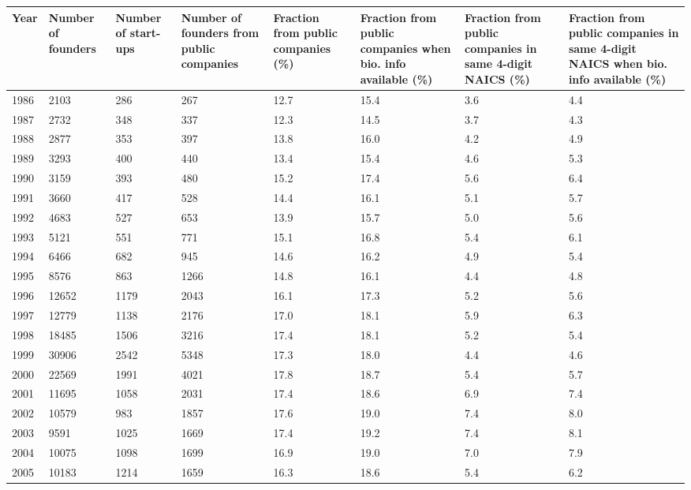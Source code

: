\begin{table}[!htb]
\centering
\begingroup\scriptsize
\begin{tabular}{p{1.75cm}p{1.75cm}p{1.75cm}p{1.75cm}p{1.75cm}p{1.75cm}p{1.75cm}p{1.75cm}}
  \toprule
Year & Number of founders & Number of start-ups & Number of founders from public companies & Fraction from public companies (\%) & Fraction from public companies when bio. info available (\%) & Fraction from public companies in same 4-digit NAICS (\%) & Fraction from public companies in same 4-digit NAICS when bio. info available (\%) \\ 
  \midrule
1986 & 2103 & 286 & 267 & 12.7 & 15.4 & 3.6 & 4.4 \\ 
  1987 & 2732 & 348 & 337 & 12.3 & 14.5 & 3.7 & 4.3 \\ 
  1988 & 2877 & 353 & 397 & 13.8 & 16.0 & 4.2 & 4.9 \\ 
  1989 & 3293 & 400 & 440 & 13.4 & 15.4 & 4.6 & 5.3 \\ 
  1990 & 3159 & 393 & 480 & 15.2 & 17.4 & 5.6 & 6.4 \\ 
  1991 & 3660 & 417 & 528 & 14.4 & 16.1 & 5.1 & 5.7 \\ 
  1992 & 4683 & 527 & 653 & 13.9 & 15.7 & 5.0 & 5.6 \\ 
  1993 & 5121 & 551 & 771 & 15.1 & 16.8 & 5.4 & 6.1 \\ 
  1994 & 6466 & 682 & 945 & 14.6 & 16.2 & 4.9 & 5.4 \\ 
  1995 & 8576 & 863 & 1266 & 14.8 & 16.1 & 4.4 & 4.8 \\ 
  1996 & 12652 & 1179 & 2043 & 16.1 & 17.3 & 5.2 & 5.6 \\ 
  1997 & 12779 & 1138 & 2176 & 17.0 & 18.1 & 5.9 & 6.3 \\ 
  1998 & 18485 & 1506 & 3216 & 17.4 & 18.1 & 5.2 & 5.4 \\ 
  1999 & 30906 & 2542 & 5348 & 17.3 & 18.0 & 4.4 & 4.6 \\ 
  2000 & 22569 & 1991 & 4021 & 17.8 & 18.7 & 5.4 & 5.7 \\ 
  2001 & 11695 & 1058 & 2031 & 17.4 & 18.6 & 6.9 & 7.4 \\ 
  2002 & 10579 & 983 & 1857 & 17.6 & 19.0 & 7.4 & 8.0 \\ 
  2003 & 9591 & 1025 & 1669 & 17.4 & 19.2 & 7.4 & 8.1 \\ 
  2004 & 10075 & 1098 & 1699 & 16.9 & 19.0 & 7.0 & 7.9 \\ 
  2005 & 10183 & 1214 & 1659 & 16.3 & 18.6 & 5.4 & 6.2 \\ 

\end{tabular}
\end{table}
